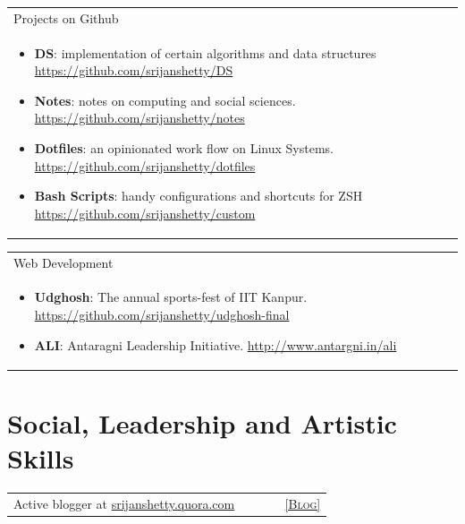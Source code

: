 \documentclass[a4paper,10pt]{article} %
\newcommand{\projectlist}[2]{
    \begin{tabular}{p{\linewidth}}
        \textcolor{NavyBlue}{#1}\\
        \vspace{-0.3cm}
        \footnotesize{#2}
    \end{tabular}
    \vspace{-0.4cm}
}
\newcommand{\skill}[2]{
    \begin{tabular}{p{0.85\linewidth}r}
        #2 & \multicolumn{1}{m{3cm}}{\raggedleft \textsc{#1}}\\
    \end{tabular}
    \vspace{-0.5cm}
}
\begin{document}
\projectlist {Projects on Github}
             {
                 \begin{itemize}[leftmargin=0.5cm]
                     \item \textbf{DS}: implementation of certain algorithms and data structures
                         \href{https://github.com/srijanshetty/DS} {https://github.com/srijanshetty/DS}
                     \item \textbf{Notes}: notes on computing and social sciences.
                         \href{https://github.com/srijanshetty/notes} {https://github.com/srijanshetty/notes}
                     \item \textbf{Dotfiles}: an opinionated work flow on Linux Systems.
                         \href{https://github.com/srijanshetty/dotfiles} {https://github.com/srijanshetty/dotfiles}
                     \item \textbf{Bash Scripts}: handy configurations and shortcuts for ZSH
                         \href{https://github.com/srijanshetty/custom} {https://github.com/srijanshetty/custom}
                 \end{itemize}
             }

\projectlist {Web Development}
             {
                 \begin{itemize}[leftmargin=0.5cm]
                     \item \textbf{Udghosh}: The annual sports-fest of IIT Kanpur.
                         \href{https://github.com/srijanshetty/udghosh-final}{https://github.com/srijanshetty/udghosh-final}
                     \item \textbf{ALI}: Antaragni Leadership Initiative.
                         \href{http://www.antargni.in/ali} {http://www.antargni.in/ali}
                 \end{itemize}
             }



\section {Social, Leadership and Artistic Skills}

\skill {\href{srijanshetty.quora.com} {[Blog]}}
       {Active blogger at \href{srijanshetty.quora.com} {srijanshetty.quora.com}}
\end{document}

